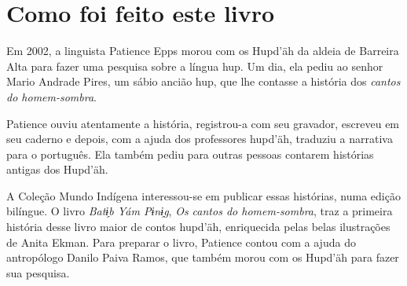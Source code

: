 \chapter{Como foi feito este livro}

Em 2002, a linguista Patience Epps morou com os Hupd’äh da aldeia de Barreira Alta para fazer uma pesquisa sobre a língua hup. Um dia, ela pediu ao senhor Mario Andrade Pires, um sábio ancião hup, que lhe contasse a história dos \textit{cantos do homem-sombra}.

Patience ouviu atentamente a história, registrou-a com seu gravador, escreveu em seu caderno e depois, com a ajuda dos professores hupd’äh, traduziu a narrativa para o português. Ela também pediu para outras pessoas contarem histórias antigas dos Hupd’äh.


A Coleção Mundo Indígena interessou-se em publicar essas histórias, numa edição bilíngue. O livro \textit{Batɨ̗b  Yám Pɨnɨ̗g}, \textit{Os cantos do homem-sombra}, traz a primeira história desse livro maior de contos hupd’äh, enriquecida pelas belas ilustrações de Anita Ekman. Para preparar o livro, Patience contou com a ajuda do antropólogo Danilo Paiva Ramos, que também morou com os Hupd’äh para fazer sua pesquisa.



